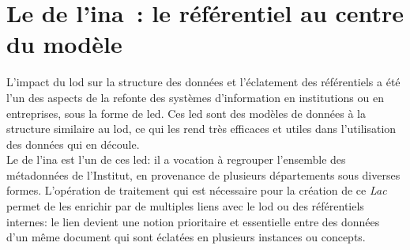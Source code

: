 \chapter{\label{III-B}Le \ldd de l’\ac{ina} : le référentiel au centre du modèle}

L'impact du \ac{lod} sur la structure des données et l'éclatement des référentiels a été l'un des aspects de la refonte des systèmes d'information en institutions ou en entreprises, sous la forme de \ac{led}. Ces \ac{led} sont des modèles de données à la structure similaire au \ac{lod}, ce qui les rend très efficaces et utiles dans l'utilisation des données qui en découle.\\

Le \ldd de l'\ac{ina} est l'un de ces \ac{led}: il a vocation à regrouper l'ensemble des métadonnées de l'Institut, en provenance de plusieurs départements sous diverses formes.  L'opération de traitement qui est nécessaire pour la création de ce \textit{Lac} permet de les enrichir par de multiples liens avec le \ac{lod} ou des référentiels internes: le lien devient une notion prioritaire et essentielle entre des données d'un même document qui sont éclatées en plusieurs instances ou concepts.




